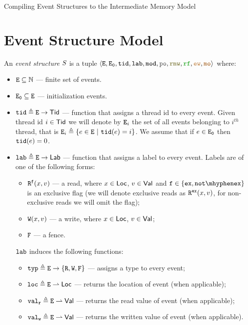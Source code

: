 \documentclass[12pt]{article}
\begin{document}
\begin{center}
{\center \LARGE Compiling Event Structures to the Intermediate Memory Model }
\end{center}

\section{Event Structure Model}

\begin{definition}
  An \emph{event structure} $\lES$ is a tuple
  $\tup{\lE, \lEi, \lTID, \lLAB, \lMOD, \lPO, \lRMW, \lRF, \lEW, \lMO}$ where:
  \begin{itemize}
  \item $\lE \subseteq \N$ --- finite set of events. 
  \item $\lEi \subseteq \lE$ --- initialization events.
  \item $\lTID \defeq \lE \fun \Tid$ --- function that assigns a thread id to every event.
    Given thread id $i \in \Tid$ we will denote by $\lE_i$ the set of all events belonging 
    to $i^{th}$ thread, that is $\lE_i \defeq \{e \in \lE ~|~ \lTID(e) = i\}$.
    We assume that if $e \in \lEi$ then $\lTID(e) = 0$.
  \item $\lLAB \defeq \lE \fun \Lab$ --- function that assigns a label to every event.
    Labels are of one of the following forms:
    \begin{itemize}
    \item $\rlabExExpl{x}{v}{\mathtt{f}}$ --- a read, where $x \in \Loc$, $v \in \Val$ 
      and $\mathtt{f} \in \{\Ex, \NotEx\}$ is an exclusive flag 
      (we will denote exclusive reads as $\rlabEx{x}{v}$,
       for non-exclusive reads we will omit the flag);
    \item $\wlab{x}{v}$ --- a write, where $x \in \Loc$, $v \in \Val$;
    \item $\flab$ --- a fence.
    \end{itemize}
    $\lLAB$ induces the following functions:
    \begin{itemize}
    \item $\lTYP \defeq \lE \fun \{\lR, \lW, \lF\}$ --- assigns a type to every event;
    \item $\lLOC \defeq \lE \pfun \Loc $ --- returns the location of event (when applicable);
    \item $\lVALR \defeq \lE \pfun \Val$ --- returns the read value of event (when applicable);
    \item $\lVALW \defeq \lE \pfun \Val$ --- returns the written value of event (when applicable).

\end{itemize}
\end{itemize}
\end{definition}
\end{document}
